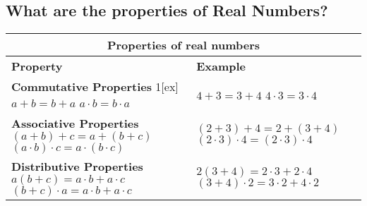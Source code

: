 \subsection{What are the properties of Real Numbers?}

\begin{tabularx}{1\textwidth}{
    p{}
    p{}
}
\toprule
\multicolumn{2}{c}{\textbf{Properties of real numbers}} \\
\midrule

\textbf{Property} & \textbf{Example}\\
\midrule

\makecell[l]{
    \textbf{Commutative Properties} \\ 1[ex]
    $a + b = b + a$ \\ 
    $a \cdot b = b \cdot a$
} 
& 
\makecell[l]{
    $4 + 3 = 3 + 4$ \\ 
    $4 \cdot 3 = 3 \cdot 4$
} 
\\
\midrule

\makecell[l]{
    \textbf{Associative Properties} \\[1ex] 
    $(a + b) + c = a + (b + c)$ \\ 
    $(a \cdot b) \cdot c = a \cdot (b \cdot c)$
} 
&
\makecell[l]{
    $(2 + 3) + 4 = 2 + (3 + 4)$ \\ 
    $(2 \cdot 3) \cdot 4 = (2 \cdot 3) \cdot 4$
} 
\\

\midrule

\makecell[l]{
    \textbf{Distributive Properties} \\[1ex] 
    $a(b + c) = a \cdot b + a \cdot c$ \\ 
    $(b + c) \cdot a = a \cdot b + a \cdot c$
} 
& 
\makecell[l]{
    $2(3 + 4) = 2 \cdot 3 + 2 \cdot 4$ \\ 
    $(3 + 4) \cdot 2 = 3 \cdot 2 + 4 \cdot 2$
} 
\\  

\bottomrule
\end{tabularx}
